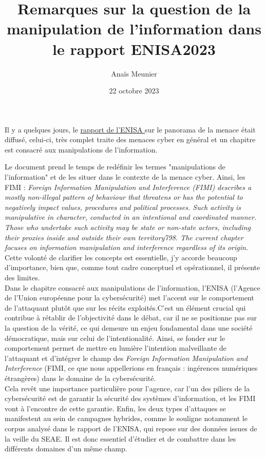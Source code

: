 \documentclass[a4paper]{article}
\title{Remarques sur la question de la manipulation de l'information dans le rapport ENISA2023}
\author{Anaïs Meunier} %
\date{22 octobre 2023}
\begin{document}
\maketitle                 

Il y a quelques jours, le \href{https://www.enisa.europa.eu/publications/enisa-threat-landscape-2023}{rapport de l'ENISA }sur le panorama de la menace était diffusé, celui-ci, très complet traite des menaces cyber en général et un chapitre est consacré aux manipulations de l'information.

Le document prend le temps de redéfinir les termes "manipulations de l'information" et de les situer dans le contexte de la menace cyber. Ainsi, les FIMI : \textit{Foreign Information Manipulation and Interference (FIMI) describes a mostly non-illegal pattern of behaviour that threatens or has the potential to negatively impact values, procedures and political processes. Such activity is manipulative in character, conducted in an intentional and coordinated manner. Those who undertake such activity may be state or non-state actors, including their proxies inside and outside their own territory798. The current chapter focuses on information manipulation and interference regardless of its origin.}
Cette volonté de clarifier les concepts est essentielle, j'y accorde beaucoup d'importance, bien que, comme tout cadre conceptuel et opérationnel, il présente des limites.
\\

Dans le chapitre consacré aux manipulations de l'information, l'ENISA (l’Agence de l’Union européenne pour la cybersécurité) met l’accent sur le comportement de l’attaquant plutôt que sur les récits exploités.C'est un élément crucial qui contribue à rétablir de l'objectivité dans le débat, car il ne se positionne pas sur la question de la vérité, ce qui demeure un enjeu fondamental dans une société démocratique, mais sur celui de l'intentionalité. Ainsi, se fonder sur le comportement permet de mettre en lumière l'intention malveillante de l'attaquant et d'intégrer le champ des \textit{Foreign Information Manipulation and Interference} (FIMI, ce que nous appellerions en français : ingérences numériques étrangères) dans le domaine de la cybersécurité.
\\

Cela revêt une importance particulière pour l'agence, car l'un des piliers de la cybersécurité est de garantir la sécurité des systèmes d'information, et les FIMI vont à l'encontre de cette garantie. Enfin, les deux types d'attaques se manifestent au sein de campagnes hybrides, comme le souligne notamment le corpus analysé dans le rapport de l'ENISA, qui repose sur des données issues de la veille du SEAE. Il est donc essentiel d'étudier et de combattre dans les différents domaines d'un même champ.
\\
\end{document}

